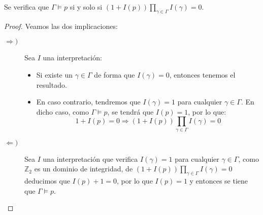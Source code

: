 \begin{prop}
    Se verifica que $\Gamma\vDash p$ si y solo si $(1+I(p))\displaystyle\prod_{\gamma\in \Gamma}I(\gamma) = 0$.
    \begin{proof}
        Veamos las dos implicaciones:
    \begin{description}
        \item [$\Longrightarrow)$] 
            Sea $I$ una interpretación:
            \begin{itemize}
                \item Si existe un $\gamma\in \Gamma$ de forma que $I(\gamma)=0$, entonces tenemos el resultado.
                \item En caso contrario, tendremos que $I(\gamma)=1$ para cualquier $\gamma\in \Gamma$. En dicho caso, como $\Gamma\vDash p$, se tendrá que $I(p)=1$, por lo que:
                    \begin{equation*}
                        1 + I(p) = 0 \Longrightarrow (1+I(p))\displaystyle\prod_{\gamma\in \Gamma}I(\gamma) = 0
                    \end{equation*}
            \end{itemize}
        \item [$\Longleftarrow)$] 
            Sea $I$ una interpretación que verifica $I(\gamma)=1$ para cualquier $\gamma\in \Gamma$, como $\mathbb{Z}_2$ es un dominio de integridad, de $(1+I(p))\displaystyle\prod_{\gamma\in \Gamma}I(\gamma) = 0$ deducimos que $I(p) +1=0$, por lo que $I(p) = 1$ y entonces se tiene que $\Gamma\vDash p$.
    \end{description}
    \end{proof}
\end{prop}

